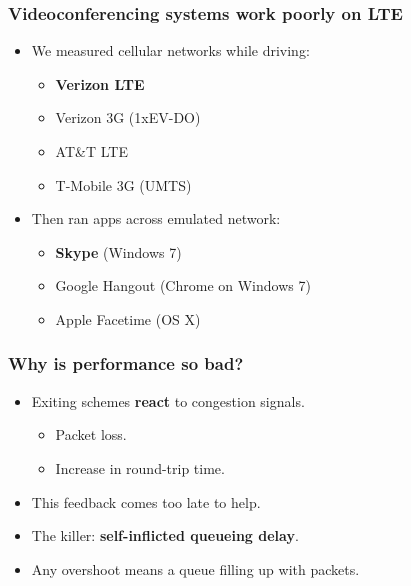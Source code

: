 \documentclass[svgnames]{beamer}
\begin{document}
\begin{frame}
\frametitle{Videoconferencing systems work poorly on LTE}

\begin{itemize}
\item We measured cellular networks while driving:

\begin{itemize}
\item {\color{red}\bf Verizon LTE}
\item Verizon 3G (1xEV-DO)
\item AT\&T LTE
\item T-Mobile 3G (UMTS)
\end{itemize}

\item Then ran apps across emulated network:

\begin{itemize}
\item {\color{red}\bf Skype} (Windows 7)
\item Google Hangout (Chrome on Windows 7)
\item Apple Facetime (OS X)
\end{itemize}

\end{itemize}

\end{frame}

\begin{frame}
\frametitle{Why is performance so bad?}

\begin{itemize}
\item Exiting schemes \textbf{react} to congestion signals.

\begin{itemize}
\item Packet loss.
\item Increase in round-trip time.
\end{itemize}

\item This feedback comes too late to help.

\item The killer: \textbf{self-inflicted queueing delay}.

\item Any overshoot means a queue filling up with packets.

\end{itemize}

\end{frame}
\end{document}
